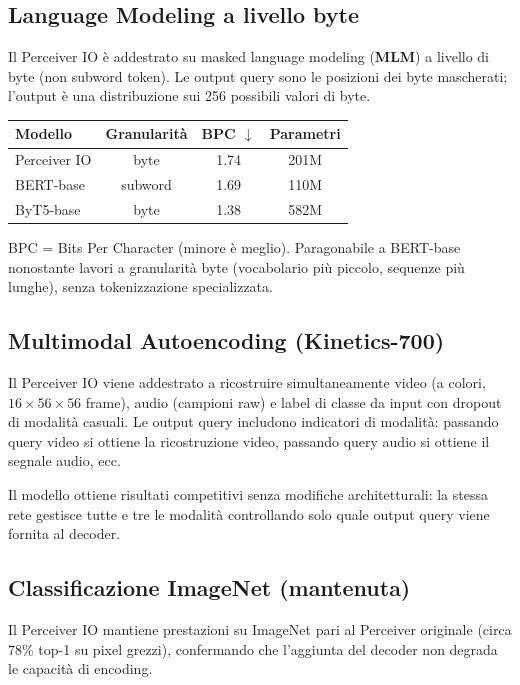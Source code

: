 \documentclass[
  11pt,
]{article}
\begin{document}
\subsection{Language Modeling a livello byte}

Il Perceiver IO è addestrato su masked language modeling (\textbf{MLM}) a livello di byte (non subword token). Le output query sono le posizioni dei byte mascherati; l'output è una distribuzione sui 256 possibili valori di byte.

\begin{center}
\begin{tabular}{lccc}
\toprule
\textbf{Modello} & \textbf{Granularità} & \textbf{BPC $\downarrow$} & \textbf{Parametri} \\
\midrule
Perceiver IO & byte & 1.74 & 201M \\
BERT-base & subword & 1.69 & 110M \\
ByT5-base & byte & 1.38 & 582M \\
\bottomrule
\end{tabular}
\end{center}

BPC = Bits Per Character (minore è meglio). Paragonabile a BERT-base nonostante lavori a granularità byte (vocabolario più piccolo, sequenze più lunghe), senza tokenizzazione specializzata.

\subsection{Multimodal Autoencoding (Kinetics-700)}

Il Perceiver IO viene addestrato a ricostruire simultaneamente video (a colori, $16 \times 56 \times 56$ frame), audio (campioni raw) e label di classe da input con dropout di modalità casuali. Le output query includono indicatori di modalità: passando query video si ottiene la ricostruzione video, passando query audio si ottiene il segnale audio, ecc.

Il modello ottiene risultati competitivi senza modifiche architetturali: la stessa rete gestisce tutte e tre le modalità controllando solo quale output query viene fornita al decoder.

\subsection{Classificazione ImageNet (mantenuta)}

Il Perceiver IO mantiene prestazioni su ImageNet pari al Perceiver originale (circa $78\%$ top-1 su pixel grezzi), confermando che l'aggiunta del decoder non degrada le capacità di encoding.
\end{document}
